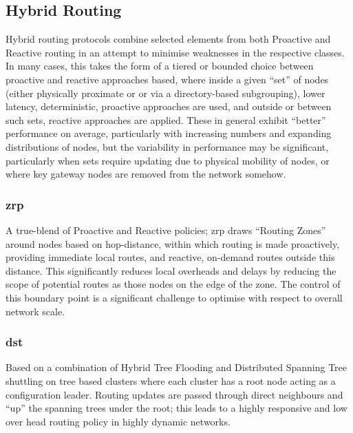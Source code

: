 \subsection{Hybrid Routing}

Hybrid routing protocols combine selected elements from both Proactive and Reactive routing  in an attempt to minimise weaknesses in the respective classes.
In many cases, this takes the form of a tiered or bounded choice between proactive and reactive approaches based, where inside a given ``set'' of nodes (either physically proximate or or via a directory-based subgrouping), lower latency, deterministic, proactive approaches are used, and outside or between such sets, reactive approaches are applied.
These in general exhibit ``better'' performance on average, particularly with increasing numbers and expanding distributions of nodes, but the variability in performance may be significant, particularly when sets require updating due to physical mobility of nodes, or where key gateway nodes are removed from the network somehow. 

\subsubsection{\gls{zrp}}
A true-blend of Proactive and Reactive policies; \gls{zrp} draws ``Routing Zones'' around nodes based on hop-distance, within which routing is made proactively, providing immediate local routes, and reactive, on-demand routes outside this distance. This significantly reduces local overheads and delays by reducing the scope of potential routes as those nodes on the edge of the zone. The control of this boundary point is a significant challenge to optimise with respect to overall network scale. \\
\subsubsection{\gls{dst}}
Based on a combination of Hybrid Tree Flooding and Distributed Spanning Tree shuttling on tree based clusters where each cluster has a root node acting as a configuration leader. Routing updates are passed through direct neighbours and ``up'' the spanning trees under the root; this leads to a highly responsive and low over head routing policy in highly dynamic networks.\cite{Radhakrishnan1999}\\
